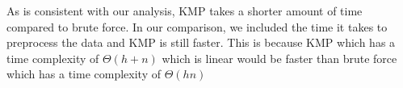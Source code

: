 As is consistent with our analysis, KMP takes a shorter amount of time compared to brute force. In our comparison, we included the time it takes to preprocess the data and KMP is still faster. This is because KMP which has a time complexity of $\Theta(h+n)$ which is linear would be faster than brute force which has a time complexity of $\Theta(hn)$
